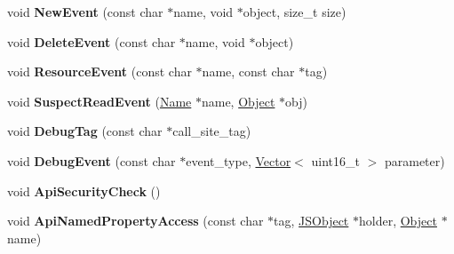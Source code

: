 \begin{DoxyCompactItemize}
\item 
void {\bfseries New\+Event} (const char $\ast$name, void $\ast$object, size\+\_\+t size)\hypertarget{classv8_1_1internal_1_1_logger_a32c89d2d5ca535c3e0b9e00b73275528}{}\label{classv8_1_1internal_1_1_logger_a32c89d2d5ca535c3e0b9e00b73275528}

\item 
void {\bfseries Delete\+Event} (const char $\ast$name, void $\ast$object)\hypertarget{classv8_1_1internal_1_1_logger_a1d8c8690eb3d3d0a3e784da1d6fea25e}{}\label{classv8_1_1internal_1_1_logger_a1d8c8690eb3d3d0a3e784da1d6fea25e}

\item 
void {\bfseries Resource\+Event} (const char $\ast$name, const char $\ast$tag)\hypertarget{classv8_1_1internal_1_1_logger_a6c913c6d1dc334b9b34804ffa5eaf57c}{}\label{classv8_1_1internal_1_1_logger_a6c913c6d1dc334b9b34804ffa5eaf57c}

\item 
void {\bfseries Suspect\+Read\+Event} (\hyperlink{classv8_1_1internal_1_1_name}{Name} $\ast$name, \hyperlink{classv8_1_1internal_1_1_object}{Object} $\ast$obj)\hypertarget{classv8_1_1internal_1_1_logger_a7ca5649d8233938ab1f3ddbef1daecb4}{}\label{classv8_1_1internal_1_1_logger_a7ca5649d8233938ab1f3ddbef1daecb4}

\item 
void {\bfseries Debug\+Tag} (const char $\ast$call\+\_\+site\+\_\+tag)\hypertarget{classv8_1_1internal_1_1_logger_aeeeb8e161468f561de6e573a4f146e66}{}\label{classv8_1_1internal_1_1_logger_aeeeb8e161468f561de6e573a4f146e66}

\item 
void {\bfseries Debug\+Event} (const char $\ast$event\+\_\+type, \hyperlink{classv8_1_1internal_1_1_vector}{Vector}$<$ uint16\+\_\+t $>$ parameter)\hypertarget{classv8_1_1internal_1_1_logger_a10c2da30789262e9cafb452ed2262629}{}\label{classv8_1_1internal_1_1_logger_a10c2da30789262e9cafb452ed2262629}

\item 
void {\bfseries Api\+Security\+Check} ()\hypertarget{classv8_1_1internal_1_1_logger_a0053fdf1c9ff5687fd8233140f08aafc}{}\label{classv8_1_1internal_1_1_logger_a0053fdf1c9ff5687fd8233140f08aafc}

\item 
void {\bfseries Api\+Named\+Property\+Access} (const char $\ast$tag, \hyperlink{classv8_1_1internal_1_1_j_s_object}{J\+S\+Object} $\ast$holder, \hyperlink{classv8_1_1internal_1_1_object}{Object} $\ast$name)\hypertarget{classv8_1_1internal_1_1_logger_aa2654b090974d25e35d51a14f90ddf06}{}\label{classv8_1_1internal_1_1_logger_aa2654b090974d25e35d51a14f90ddf06}


\end{DoxyCompactItemize}
